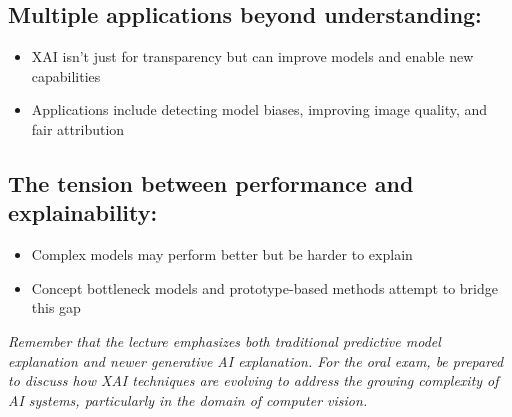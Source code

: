 \subsection*{Multiple applications beyond understanding:}
\begin{itemize}
    \item XAI isn't just for transparency but can improve models and enable new capabilities
    \item Applications include detecting model biases, improving image quality, and fair attribution
\end{itemize}

\subsection*{The tension between performance and explainability:}
\begin{itemize}
    \item Complex models may perform better but be harder to explain
    \item Concept bottleneck models and prototype-based methods attempt to bridge this gap
\end{itemize}

\textit{Remember that the lecture emphasizes both traditional predictive model explanation and newer generative AI explanation. For the oral exam, be prepared to discuss how XAI techniques are evolving to address the growing complexity of AI systems, particularly in the domain of computer vision.}
